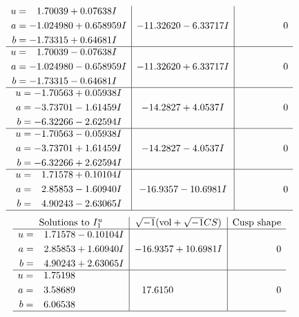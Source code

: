 \documentclass[1p]{elsarticle_modified}
\theoremstyle{definition}
\newcommand{\I}{\sqrt{-1}}
\begin{document}
$$\begin{array}{c|c|c}
\begin{aligned}
u &= \phantom{-}1.70039 + 0.07638 I \\
a &= -1.024980 + 0.658959 I \\
b &= -1.73315 + 0.64681 I\end{aligned}
 & -11.32620 - 6.33717 I & \phantom{-0.000000 } 0 \\ \hline\begin{aligned}
u &= \phantom{-}1.70039 - 0.07638 I \\
a &= -1.024980 - 0.658959 I \\
b &= -1.73315 - 0.64681 I\end{aligned}
 & -11.32620 + 6.33717 I & \phantom{-0.000000 } 0 \\ \hline\begin{aligned}
u &= -1.70563 + 0.05938 I \\
a &= -3.73701 - 1.61459 I \\
b &= -6.32266 - 2.62594 I\end{aligned}
 & -14.2827 + 4.0537 I & \phantom{-0.000000 } 0 \\ \hline\begin{aligned}
u &= -1.70563 - 0.05938 I \\
a &= -3.73701 + 1.61459 I \\
b &= -6.32266 + 2.62594 I\end{aligned}
 & -14.2827 - 4.0537 I & \phantom{-0.000000 } 0 \\ \hline\begin{aligned}
u &= \phantom{-}1.71578 + 0.10104 I \\
a &= \phantom{-}2.85853 - 1.60940 I \\
b &= \phantom{-}4.90243 - 2.63065 I\end{aligned}
 & -16.9357 - 10.6981 I & \phantom{-0.000000 } 0\\
 \hline 
 \end{array}$$\newpage$$\begin{array}{c|c|c}  
\text{Solutions to }I^u_{1}& \I (\text{vol} + \sqrt{-1}CS) & \text{Cusp shape}\\
 \hline 
\begin{aligned}
u &= \phantom{-}1.71578 - 0.10104 I \\
a &= \phantom{-}2.85853 + 1.60940 I \\
b &= \phantom{-}4.90243 + 2.63065 I\end{aligned}
 & -16.9357 + 10.6981 I & \phantom{-0.000000 } 0 \\ \hline\begin{aligned}
u &= \phantom{-}1.75198\phantom{ +0.000000I} \\
a &= \phantom{-}3.58689\phantom{ +0.000000I} \\
b &= \phantom{-}6.06538\phantom{ +0.000000I}\end{aligned}
 & \phantom{-}17.6150\phantom{ +0.000000I} & \phantom{-0.000000 } 0\\
 \hline 
 \end{array}$$\newpage\newpage\renewcommand{\arraystretch}{1}
\end{document}
